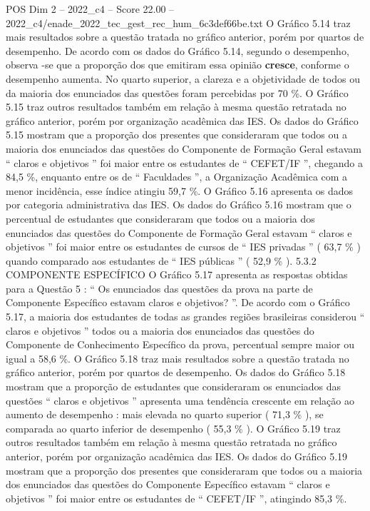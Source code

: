 \begin{textsample}{POS Dim 2 – 2022\_c4 – Score 22.00 – 2022\_c4/enade\_2022\_tec\_gest\_rec\_hum\_6c3def66be.txt}
O Gráfico 5.14 traz mais resultados sobre a questão tratada no gráfico anterior, porém por quartos de desempenho.
De acordo com os dados do Gráfico 5.14, segundo o desempenho, observa -se que a proporção dos que emitiram essa opinião \textbf{cresce}, conforme o desempenho aumenta.
No quarto superior, a clareza e a objetividade de todos ou da maioria dos enunciados das questões foram percebidas por 70 \%.
O Gráfico 5.15 traz outros resultados também em relação à mesma questão retratada no gráfico anterior, porém por organização acadêmica das IES.
Os dados do Gráfico 5.15 mostram que a proporção dos presentes que consideraram que todos ou a maioria dos enunciados das questões do Componente de Formação Geral estavam “ claros e objetivos ” foi maior entre os estudantes de “ CEFET/IF ”, chegando a 84,5 \%, enquanto entre os de “ Faculdades ”, a Organização Acadêmica com a menor incidência, esse índice atingiu 59,7 \%.
O Gráfico 5.16 apresenta os dados por categoria administrativa das IES.
Os dados do Gráfico 5.16 mostram que o percentual de estudantes que consideraram que todos ou a maioria dos enunciados das questões do Componente de Formação Geral estavam “ claros e objetivos ” foi maior entre os estudantes de cursos de “ IES privadas ” ( 63,7 \% ) quando comparado aos estudantes de “ IES públicas ” ( 52,9 \% ). 5.3.2 COMPONENTE ESPECÍFICO O Gráfico 5.17 apresenta as respostas obtidas para a Questão 5 : “ Os enunciados das questões da prova na parte de Componente Específico estavam claros e objetivos? ”.
De acordo com o Gráfico 5.17, a maioria dos estudantes de todas as grandes regiões brasileiras considerou “ claros e objetivos ” todos ou a maioria dos enunciados das questões do Componente de Conhecimento Específico da prova, percentual sempre maior ou igual a 58,6 \%.
O Gráfico 5.18 traz mais resultados sobre a questão tratada no gráfico anterior, porém por quartos de desempenho.
Os dados do Gráfico 5.18 mostram que a proporção de estudantes que consideraram os enunciados das questões “ claros e objetivos ” apresenta uma tendência crescente em relação ao aumento de desempenho : mais elevada no quarto superior ( 71,3 \% ), se comparada ao quarto inferior de desempenho ( 55,3 \% ).
O Gráfico 5.19 traz outros resultados também em relação à mesma questão retratada no gráfico anterior, porém por organização acadêmica das IES.
Os dados do Gráfico 5.19 mostram que a proporção dos presentes que consideraram que todos ou a maioria dos enunciados das questões do Componente Específico estavam “ claros e objetivos ” foi maior entre os estudantes de “ CEFET/IF ”, atingindo 85,3 \%.

\end{textsample}
